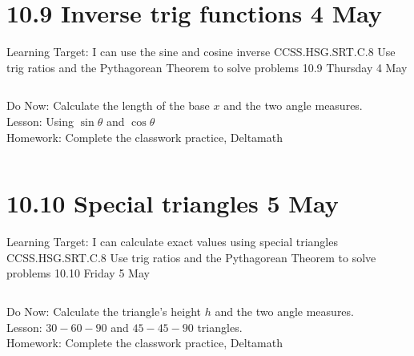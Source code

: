 \documentclass[onlytextwidth, aspectratio=169]{beamer}
\begin{document}
\section{10.9 Inverse trig functions \hfill 4 May \,}
\begin{frame}{Learning Target: I can use the sine and cosine inverse}
  {CCSS.HSG.SRT.C.8 Use trig ratios and the Pythagorean Theorem to solve problems \hfill \alert{10.9 Thursday 4 May}}
  \begin{columns}
    Do Now: Calculate the length of the base $x$ and the two angle measures. \\[0.5cm]
    Lesson: Using $\sin \theta$ and $\cos \theta$ \\[0.5cm]
    Homework: Complete the classwork practice, Deltamath \\
    \begin{flushright}
    \end{flushright}
  \end{columns}
\end{frame}

\section{10.10 Special triangles \hfill 5 May \,}
\begin{frame}{Learning Target: I can calculate exact values using special triangles}
  {CCSS.HSG.SRT.C.8 Use trig ratios and the Pythagorean Theorem to solve problems \hfill \alert{10.10 Friday 5 May}}
  \begin{columns}
    Do Now: Calculate the triangle's height $h$ and the two angle measures. \\[0.5cm]
    Lesson: $30-60-90$ and $45-45-90$ triangles. \\[0.5cm]
    Homework: Complete the classwork practice, Deltamath \\
    \begin{flushright}
    \end{flushright}
  \end{columns}
\end{frame}
\end{document}

